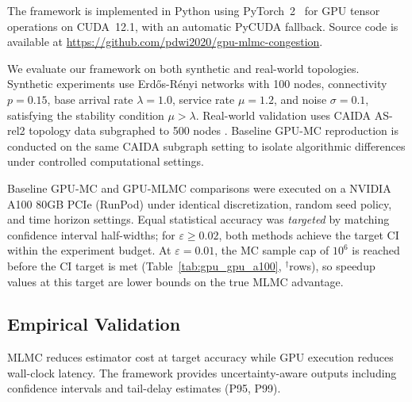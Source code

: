 \documentclass[pdflatex,sn-mathphys-num]{sn-jnl}
\theoremstyle{thmstyleone}%
\theoremstyle{thmstyletwo}%
\theoremstyle{thmstylethree}%
\begin{document}
The framework is implemented in Python using PyTorch~2~\cite{pytorch2024} for GPU tensor operations on CUDA~12.1, with an automatic PyCUDA fallback. Source code is available at \url{https://github.com/pdwi2020/gpu-mlmc-congestion}.

We evaluate our framework on both synthetic and real-world topologies. Synthetic experiments use
Erd\H{o}s-R\'enyi networks with 100 nodes, connectivity $p=0.15$, base arrival rate $\lambda=1.0$,
service rate $\mu=1.2$, and noise $\sigma=0.1$, satisfying the stability condition $\mu > \lambda$.
Real-world validation uses CAIDA AS-rel2 topology data subgraphed to 500 nodes
\cite{hofstad2016}. Baseline GPU-MC reproduction is conducted on the same CAIDA subgraph setting
to isolate algorithmic differences under controlled computational settings.

Baseline GPU-MC and GPU-MLMC comparisons were executed on a NVIDIA A100 80GB PCIe (RunPod)
under identical discretization, random seed policy, and time horizon settings. Equal statistical
accuracy was \emph{targeted} by matching confidence interval half-widths; for $\varepsilon \geq
0.02$, both methods achieve the target CI within the experiment budget. At $\varepsilon=0.01$,
the MC sample cap of $10^6$ is reached before the CI target is met
(Table~\ref{tab:gpu_gpu_a100}, $^\dagger$rows), so speedup values at this target are lower bounds
on the true MLMC advantage.

\subsection{Empirical Validation}

MLMC reduces estimator cost at target accuracy while GPU execution reduces wall-clock latency. The framework provides uncertainty-aware outputs including confidence intervals and tail-delay estimates (P95, P99).
\end{document}
